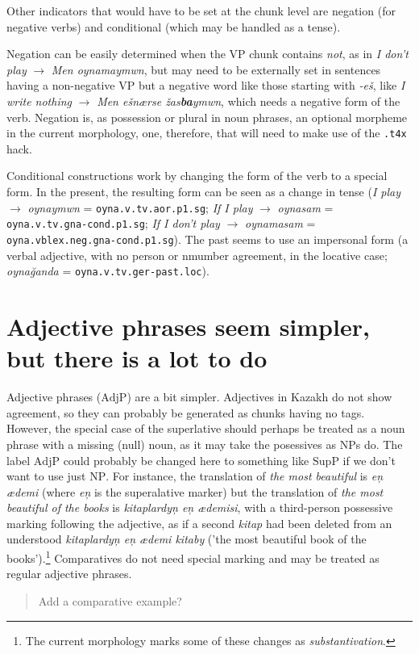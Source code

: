 \documentclass{article}
\newcommand{\com}[1]{\begin{quote}\begin{sf}#1\end{sf}\end{quote}}
\begin{document}
Other indicators that would have to be set at the chunk level are negation (for negative verbs) and conditional (which may be handled as a tense). 

Negation can be easily determined when the VP chunk contains \emph{not}, as in \emph{I don't play} \(\to\) \emph{Men oynamaymwn}, but may need to be externally set in sentences having a non-negative VP but a negative word like those starting with \emph{-eš}, like \emph{I write nothing} \(\to\) \emph{Men ešnærse \v{z}as\textbf{ba}ymwn}, which needs a negative form of the verb. Negation is, as possession or plural in noun phrases, an optional morpheme in the current morphology, one, therefore, that will need to make use of the \texttt{.t4x} hack.

Conditional constructions work by changing the form of the verb to a special form. In the present, the resulting form can be seen as a change in tense (\emph{I play} \(\to\) \emph{oynaymwn} = \texttt{oyna.v.tv.aor.p1.sg}; \emph{If I play} \(\to\) \emph{oynasam} = \texttt{oyna.v.tv.gna-cond.p1.sg}; \emph{If I don't play} \(\to\) \emph{oynamasam} = \texttt{oyna.vblex.neg.gna-cond.p1.sg}). The past seems to use an impersonal form (a verbal adjective, with no person or nmumber agreement, in the locative case; \emph{oyna\u{g}anda} = \texttt{oyna.v.tv.ger-past.loc}).

\section{Adjective phrases seem simpler, but there is a lot to do}

Adjective phrases (\(\mathrm{AdjP}\)) are a bit simpler. Adjectives in
Kazakh do not show agreement, so they can probably be generated as
chunks having no tags. However, the special case of the superlative
should perhaps be treated as a noun phrase with a missing (null) noun,
as it may take the posessives as NPs do. The label \(\mathrm{AdjP}\)
could probably be changed here to something like \(\mathrm{SupP}\) if
we don't want to use just \(\mathrm{NP}\). For instance, the
translation of \emph{the most beautiful} is \emph{e\c{n} ædemi} (where
\emph{e\c{n}} is the superalative marker) but the translation of
\emph{the most beautiful of the books} is \emph{kitaplardy\c{n} e\c{n}
  ædemisi}, with a third-person possessive marking following the
adjective, as if a second \emph{kitap} had been deleted from an
understood \emph{kitaplardy\c{n} e\c{n} ædemi kitaby} ('the most
beautiful book of the books').\footnote{The current morphology marks
  some of these changes as \emph{substantivation}.} Comparatives do
not need special marking and may be treated as regular adjective
phrases.  \com{Add a comparative example?}
\end{document}
